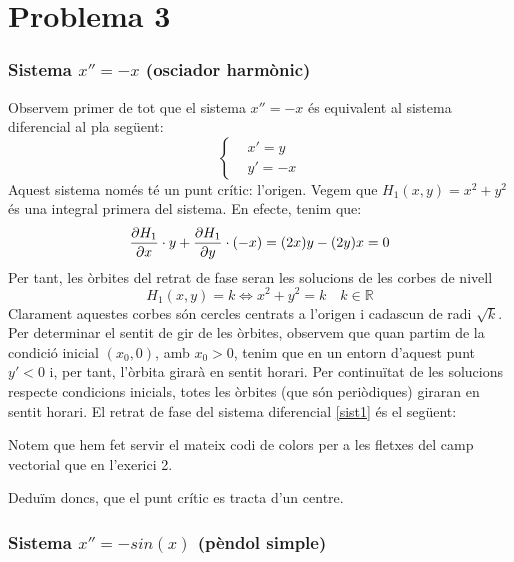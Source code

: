 \documentclass[10pt,a4paper]{article}
\newcommand{\RR}{\ensuremath{\mathbb{R}}}
\begin{document}
\section*{Problema 3}
\subsubsection*{Sistema \texorpdfstring{$x''=-x$}{x''=-x} (osci\lgem ador harmònic)}
Observem primer de tot que el sistema $x''=-x$ és equivalent al sistema diferencial al pla següent:
\begin{equation}\label{sist1}
  \left\{
  \begin{aligned}
     & x' =y   \\
     & y'  =-x
  \end{aligned}
  \right.
\end{equation}
Aquest sistema només té un punt crític: l'origen. Vegem que $H_1(x,y)=x^2+y^2$ és una integral primera del sistema. En efecte, tenim que:
$$\pdv{H_1}{x}(x,y)\cdot y+\pdv{H_1}{y}(x,y)\cdot (-x)=(2x)y-(2y)x=0$$
Per tant, les òrbites del retrat de fase seran les solucions de les corbes de nivell $$H_1(x,y)=k\iff x^2+y^2=k\quad k\in\RR$$
Clarament aquestes corbes són cercles centrats a l'origen i cadascun de radi $\sqrt{k}$. Per determinar el sentit de gir de les òrbites, observem que quan partim de la condició inicial $(x_0,0)$, amb $x_0>0$, tenim que en un entorn d'aquest punt $y'<0$ i, per tant, l'òrbita girarà en sentit horari. Per continuïtat de les solucions respecte condicions inicials, totes les òrbites (que són periòdiques) giraran en sentit horari.
El retrat de fase del sistema diferencial \eqref{sist1} és el següent:
\begin{center}
  \begin{minipage}{\linewidth}
    \centering
    
  \end{minipage}
\end{center}
Notem que hem fet servir el mateix codi de colors per a les fletxes del camp vectorial que en l'exerici 2.

Deduïm doncs, que el punt crític es tracta d'un centre.
\subsubsection*{Sistema \texorpdfstring{$x''=-sin(x)$}{x''=-sin(x)} (pèndol simple)}
\end{document}
